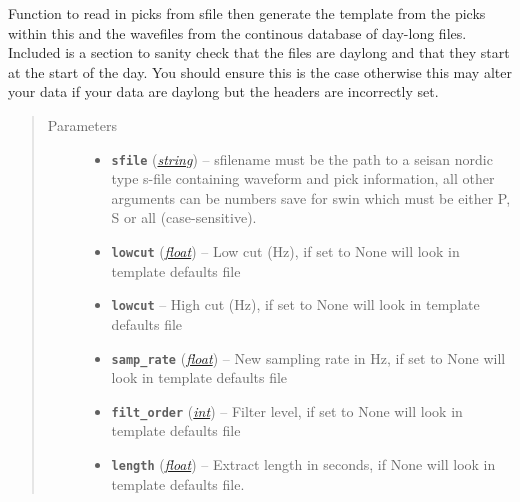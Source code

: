 \documentclass[a4paper,10pt,english]{sphinxmanual}
\begin{document}

\begin{fulllineitems}
\label{core:template_gen.from_contbase}
Function to read in picks from sfile then generate the template from the
picks within this and the wavefiles from the continous database of day-long
files.  Included is a section to sanity check that the files are daylong and
that they start at the start of the day.  You should ensure this is the case
otherwise this may alter your data if your data are daylong but the headers
are incorrectly set.
\begin{quote}\begin{description}
\item[{Parameters}] \leavevmode\begin{itemize}
\item {} 
\textbf{\texttt{sfile}} (\href{https://docs.python.org/library/string.html\#module-string}{\emph{string}}) -- sfilename must be the path to a seisan nordic type s-file             containing waveform and pick information, all other arguments can             be numbers save for swin which must be either P, S or all             (case-sensitive).

\item {} 
\textbf{\texttt{lowcut}} (\href{https://docs.python.org/library/functions.html\#float}{\emph{float}}) -- Low cut (Hz), if set to None will look in template            defaults file

\item {} 
\textbf{\texttt{lowcut}} -- High cut (Hz), if set to None will look in template            defaults file

\item {} 
\textbf{\texttt{samp\_rate}} (\href{https://docs.python.org/library/functions.html\#float}{\emph{float}}) -- New sampling rate in Hz, if set to None will look in            template defaults file

\item {} 
\textbf{\texttt{filt\_order}} (\href{https://docs.python.org/library/functions.html\#int}{\emph{int}}) -- Filter level, if set to None will look in            template defaults file

\item {} 
\textbf{\texttt{length}} (\href{https://docs.python.org/library/functions.html\#float}{\emph{float}}) -- Extract length in seconds, if None will look in template            defaults file.

\end{itemize}

\end{description}\end{quote}

\end{fulllineitems}
\end{document}
